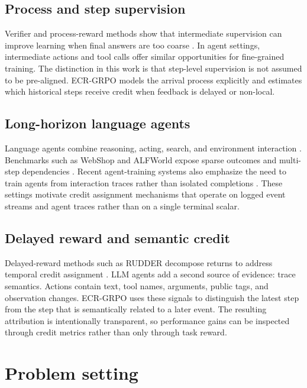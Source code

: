 \documentclass[letterpaper]{article} %
\begin{document}
\subsection{Process and step supervision}

Verifier and process-reward methods show that intermediate supervision can improve learning when final answers are too coarse \citep{cobbe2021verifiers,lightman2023verify}. In agent settings, intermediate actions and tool calls offer similar opportunities for fine-grained training. The distinction in this work is that step-level supervision is not assumed to be pre-aligned. ECR-GRPO models the arrival process explicitly and estimates which historical steps receive credit when feedback is delayed or non-local.

\subsection{Long-horizon language agents}

Language agents combine reasoning, acting, search, and environment interaction \citep{yao2022react,shinn2023reflexion,zhou2023lats}. Benchmarks such as WebShop and ALFWorld expose sparse outcomes and multi-step dependencies \citep{yao2022webshop,shridhar2020alfworld}. Recent agent-training systems also emphasize the need to train agents from interaction traces rather than isolated completions \citep{luo2025agentlightning}. These settings motivate credit assignment mechanisms that operate on logged event streams and agent traces rather than on a single terminal scalar.

\subsection{Delayed reward and semantic credit}

Delayed-reward methods such as RUDDER decompose returns to address temporal credit assignment \citep{arjonamedina2018rudder}. LLM agents add a second source of evidence: trace semantics. Actions contain text, tool names, arguments, public tags, and observation changes. ECR-GRPO uses these signals to distinguish the latest step from the step that is semantically related to a later event. The resulting attribution is intentionally transparent, so performance gains can be inspected through credit metrics rather than only through task reward.

\section{Problem setting}
\end{document}

